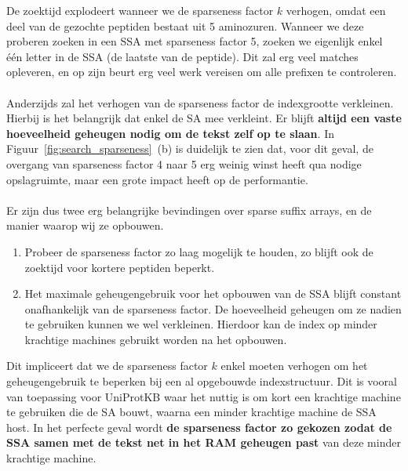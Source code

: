 De zoektijd explodeert wanneer we de sparseness factor $k$ verhogen, omdat een deel van de gezochte peptiden bestaat uit 5 aminozuren.
Wanneer we deze proberen zoeken in een SSA met sparseness factor 5, zoeken we eigenlijk enkel één letter in de SSA (de laatste van de peptide).
Dit zal erg veel matches opleveren, en op zijn beurt erg veel werk vereisen om alle prefixen te controleren.
\\ \\
Anderzijds zal het verhogen van de sparseness factor de indexgrootte verkleinen.
Hierbij is het belangrijk dat enkel de SA mee verkleint.
Er blijft \textbf{altijd een vaste hoeveelheid geheugen nodig om de tekst zelf op te slaan}.
In Figuur~\ref{fig:search_sparseness}~(b) is duidelijk te zien dat, voor dit geval, de overgang van sparseness factor 4 naar 5 erg weinig winst heeft qua nodige opslagruimte, maar een grote impact heeft op de performantie.
\\ \\
Er zijn dus twee erg belangrijke bevindingen over sparse suffix arrays, en de manier waarop wij ze opbouwen.
\begin{enumerate}
    \item Probeer de sparseness factor zo laag mogelijk te houden, zo blijft ook de zoektijd voor kortere peptiden beperkt.
    \item Het maximale geheugengebruik voor het opbouwen van de SSA blijft constant onafhankelijk van de sparseness factor.
    De hoeveelheid geheugen om ze nadien te gebruiken kunnen we wel verkleinen.
    Hierdoor kan de index op minder krachtige machines gebruikt worden na het opbouwen.
\end{enumerate}

Dit impliceert dat we de sparseness factor $k$ enkel moeten verhogen om het geheugengebruik te beperken bij een al opgebouwde indexstructuur.
Dit is vooral van toepassing voor UniProtKB waar het nuttig is om kort een krachtige machine te gebruiken die de SA bouwt, waarna een minder krachtige machine de SSA host.
In het perfecte geval wordt \textbf{de sparseness factor zo gekozen zodat de SSA samen met de tekst net in het RAM geheugen past} van deze minder krachtige machine.


